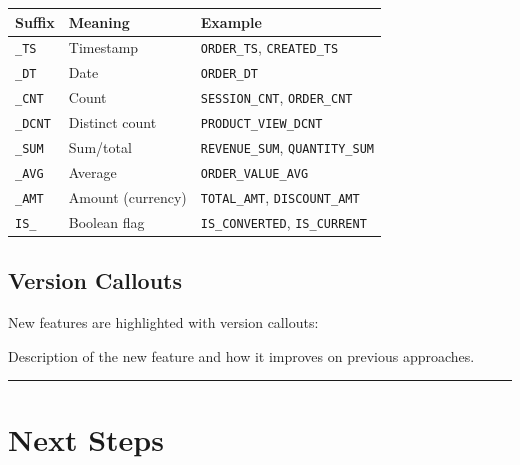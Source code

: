 \documentclass[
  letterpaper,
  DIV=11,
  numbers=noendperiod]{scrreprt}
\begin{document}
\begin{longtable}[]{@{}lll@{}}
\toprule\noalign{}
Suffix & Meaning & Example \\
\midrule\noalign{}
\endhead
\bottomrule\noalign{}
\endlastfoot
\texttt{\_TS} & Timestamp & \texttt{ORDER\_TS}, \texttt{CREATED\_TS} \\
\texttt{\_DT} & Date & \texttt{ORDER\_DT} \\
\texttt{\_CNT} & Count & \texttt{SESSION\_CNT}, \texttt{ORDER\_CNT} \\
\texttt{\_DCNT} & Distinct count & \texttt{PRODUCT\_VIEW\_DCNT} \\
\texttt{\_SUM} & Sum/total & \texttt{REVENUE\_SUM},
\texttt{QUANTITY\_SUM} \\
\texttt{\_AVG} & Average & \texttt{ORDER\_VALUE\_AVG} \\
\texttt{\_AMT} & Amount (currency) & \texttt{TOTAL\_AMT},
\texttt{DISCOUNT\_AMT} \\
\texttt{IS\_} & Boolean flag & \texttt{IS\_CONVERTED},
\texttt{IS\_CURRENT} \\
\end{longtable}

\hypertarget{version-callouts}{%
\subsection{Version Callouts}\label{version-callouts}}

New features are highlighted with version callouts:

\begin{tcolorbox}[enhanced jigsaw, title=\textcolor{quarto-callout-note-color}{\faInfo}\hspace{0.5em}{🆕 New in snowflake-ml X.X.X}, colbacktitle=quarto-callout-note-color!10!white, rightrule=.15mm, arc=.35mm, colframe=quarto-callout-note-color-frame, left=2mm, bottomtitle=1mm, toptitle=1mm, breakable, bottomrule=.15mm, opacityback=0, titlerule=0mm, toprule=.15mm, opacitybacktitle=0.6, colback=white, coltitle=black, leftrule=.75mm]

Description of the new feature and how it improves on previous
approaches.

\end{tcolorbox}

\begin{center}\rule{0.5\linewidth}{0.5pt}\end{center}

\hypertarget{next-steps}{%
\section{Next Steps}\label{next-steps}}
\end{document}
